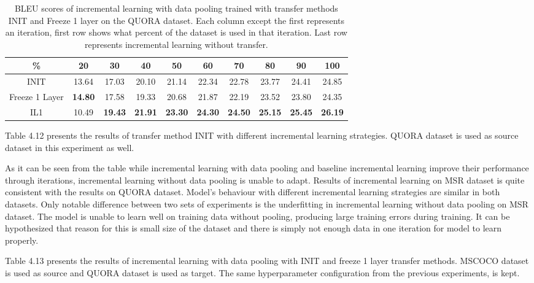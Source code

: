 \begin{table}[b]
\centering
\footnotesize
 \begin{tabular}{|c | c | c | c | c | c | c | c | c | c |} 
 \hline
 \% & 20 & 30 & 40 & 50 & 60 & 70 & 80 & 90 & 100 \\ [0.5ex] 
 \hline
  INIT & 13.64 & 17.03 & 20.10 & 21.14 & 22.34 & 22.78 & 23.77 & 24.41 & 24.85  \\ 
 \hline
  Freeze 1 Layer &  \textbf{14.80} & 17.58 & 19.33 & 20.68 & 21.87 & 22.19 & 23.52 & 23.80 & 24.35 \\ 
  \hline
  IL1 & 10.49 &  \textbf{19.43} & \textbf{21.91} &  \textbf{23.30} &  \textbf{24.30} &  \textbf{24.50} &  \textbf{25.15} &  \textbf{25.45} &  \textbf{26.19}  \\ 
 \hline
\end{tabular}
\caption{BLEU scores of incremental learning with data pooling trained with transfer methods INIT and Freeze 1 layer on the QUORA dataset. Each column except the first represents an iteration, first row shows what percent of the dataset is used in that iteration. Last row represents incremental learning without transfer.}
\end{table}

Table 4.12 presents the results of transfer method INIT with different incremental learning strategies. QUORA dataset is used as source dataset in this experiment as well. 

As it can be seen from the table while incremental learning with data pooling and baseline incremental learning improve their performance through iterations, incremental learning without data pooling is unable to adapt. Results of incremental learning on MSR dataset is quite consistent with the results on QUORA dataset. Model's behaviour with different incremental learning strategies are similar in both datasets. Only notable difference between two sets of experiments is the underfitting in incremental learning without data pooling on MSR dataset. The model is unable to learn well on training data without pooling, producing large training errors during training. It can be hypothesized that reason for this is small size of the dataset and there is simply not enough data in one iteration for model to learn properly. 

Table 4.13 presents the results of incremental learning with data pooling with INIT and freeze 1 layer transfer methods. MSCOCO dataset is used as source and QUORA dataset is used as target. The same hyperparameter configuration from the previous experiments, is kept.

